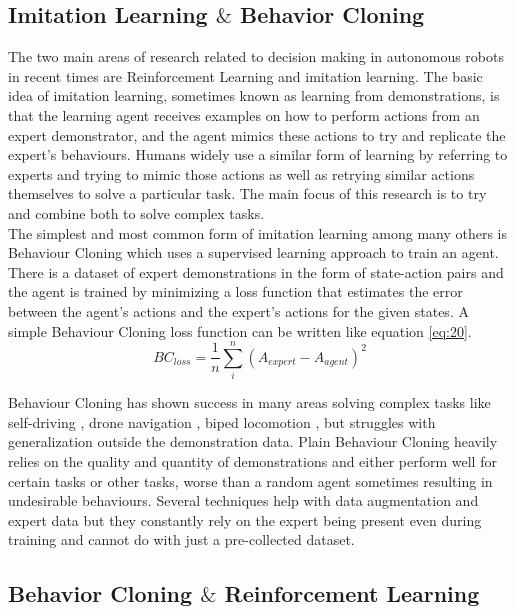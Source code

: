 \subsection{Imitation Learning $\&$ Behavior Cloning}

The two main areas of research related to decision making in autonomous robots in recent times are Reinforcement Learning and imitation learning. The basic idea of imitation learning, sometimes known as learning from demonstrations, is that the learning agent receives examples on how to perform actions from an expert demonstrator, and the agent mimics these actions to try and replicate the expert's behaviours. Humans widely use a similar form of learning by referring to experts and trying to mimic those actions as well as retrying similar actions themselves to solve a particular task. The main focus of this research is to try and combine both to solve complex tasks. \\

The simplest and most common form of imitation learning among many others is Behaviour Cloning which uses a supervised learning approach to train an agent. There is a dataset of expert demonstrations in the form of state-action pairs and the agent is trained by minimizing a loss function that estimates the error between the agent's actions and the expert's actions for the given states. A simple Behaviour Cloning loss function can be written like equation \ref{eq:20}. \\

\begin{equation}\label{eq:20}
    BC_{loss} = \frac{1}{n} \sum_{i}^{n} (A_{expert} - A_{agent})^2
\end{equation}

Behaviour Cloning has shown success in many areas solving complex tasks like self-driving \cite{bojarski2016end}, drone navigation \cite{QN}, biped locomotion \cite{BL}, but struggles with generalization outside the demonstration data. Plain Behaviour Cloning heavily relies on the quality and quantity of demonstrations and either perform well for certain tasks or other tasks, worse than a random agent sometimes resulting in undesirable behaviours. Several techniques help with data augmentation and expert data but they constantly rely on the expert being present even during training and cannot do with just a pre-collected dataset. \\

\subsection{Behavior Cloning $\&$ Reinforcement Learning}

